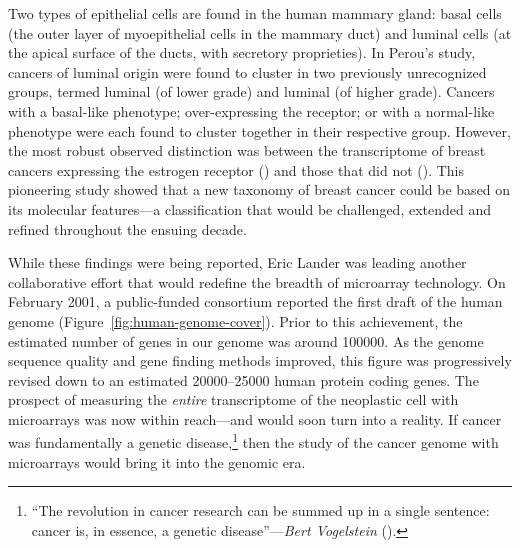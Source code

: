 Two types of epithelial cells are found in the human mammary gland: basal cells
(the outer layer of myoepithelial cells in the mammary duct) and luminal cells
(at the apical surface of the ducts, with secretory proprieties).  In Perou's
study, cancers of luminal origin were found to cluster in two previously
unrecognized groups, termed luminal  (of lower grade) and luminal
 (of higher grade).  Cancers with a \mbox{basal-like} phenotype;
\mbox{over-expressing} the  receptor; or with a normal-like
phenotype were each found to cluster together in their respective group.
However, the most robust observed distinction was between the transcriptome of
breast cancers expressing the estrogen receptor () and those that
did not ().  This pioneering study showed that a new taxonomy of
breast cancer could be based on its molecular features---a classification that
would be challenged, extended and refined throughout the ensuing
decade.\cite{sorlie_gene_2001,sorlie_repeated_2003,hu_molecular_2006,pusztai_molecular_2006,rakha_basal-like_2008,parker_supervised_2009,gusterson_basal-like_2009,weigelt_contribution_2010,prat_deconstructing_2011}


While these findings were being reported, Eric Lander was leading another
collaborative effort that would redefine the breadth of microarray technology.
On February 2001, a \mbox{public-funded} consortium reported the first draft of
the human genome (Figure~\ref{fig:human-genome-cover}).  Prior to this
achievement, the estimated number of genes in our genome was around
\num{100000}.\cite{cox_assessing_1994} As the genome sequence quality and gene
finding methods improved, this figure was progressively revised down to an
estimated \num{20000}--\num{25000} human protein coding genes.  The prospect of
measuring the \emph{entire} transcriptome of the neoplastic cell with
microarrays was now within reach---and would soon turn into a reality.  If
cancer was fundamentally a genetic disease,\footnote{``The revolution in cancer
  research can be summed up in a single sentence: cancer is, in essence, a
  genetic disease''---\emph{Bert Vogelstein}
  (\citealp{vogelstein_cancer_2004}).} then the study of the cancer genome with
microarrays would bring it into the genomic era.


